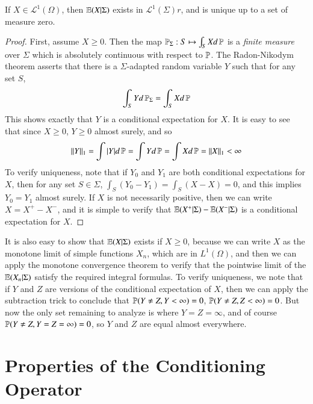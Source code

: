 
\begin{theorem}
    If $X \in \mathcal{L}^1(\Omega)$, then $\operatorname{\mathbb{E}}(X|\Sigma)$ exists in $\mathcal{L}^1(\Sigma)r$, and is unique up to a set of measure zero.
\end{theorem}
\begin{proof}
    First, assume $X \geq 0$. Then the map $\operatorname{\mathbb{P}}_\Sigma: S \mapsto \int_S X d \operatorname{\mathbb{P}}$ is a {\it finite measure} over $\Sigma$ which is absolutely continuous with respect to $\operatorname{\mathbb{P}}$. The Radon-Nikodym theorem asserts that there is a $\Sigma$-adapted random variable $Y$ such that for any set $S$,
    \[ \int_S Y d\operatorname{\mathbb{P}}_\Sigma = \int_S X d\operatorname{\mathbb{P}} \]
    This shows exactly that $Y$ is a conditional expectation for $X$. It is easy to see that since $X \geq 0$, $Y \geq 0$ almost surely, and so
    \[ \| Y \|_1 = \int |Y| d\operatorname{\mathbb{P}} = \int Yd\operatorname{\mathbb{P}} = \int Xd\operatorname{\mathbb{P}} = \| X \|_1 < \infty \]
    To verify uniqueness, note that if $Y_0$ and $Y_1$ are both conditional expectations for $X$, then for any set $S \in \Sigma$, $\int_S (Y_0 - Y_1) = \int_S (X - X) = 0$, and this implies $Y_0 = Y_1$ almost surely. If $X$ is not necessarily positive, then we can write $X = X^+ - X^-$, and it is simple to verify that $\operatorname{\mathbb{E}}(X^+|\Sigma) - \operatorname{\mathbb{E}}(X^-|\Sigma)$ is a conditional expectation for $X$.
\end{proof}

It is also easy to show that $\operatorname{\mathbb{E}}(X|\Sigma)$ exists if $X \geq 0$, because we can write $X$ as the monotone limit of simple functions $X_n$, which are in $L^1(\Omega)$, and then we can apply the monotone convergence theorem to verify that the pointwise limit of the $\operatorname{\mathbb{E}}(X_n|\Sigma)$ satisfy the required integral formulas. To verify uniqueness, we note that if $Y$ and $Z$ are versions of the conditional expectation of $X$, then we can apply the subtraction trick to conclude that $\operatorname{\mathbb{P}}(Y \neq Z, Y < \infty) = 0$, $\operatorname{\mathbb{P}}(Y \neq Z, Z < \infty) = 0$. But now the only set remaining to analyze is where $Y = Z = \infty$, and of course $\operatorname{\mathbb{P}}(Y \neq Z, Y = Z = \infty) = 0$, so $Y$ and $Z$ are equal almost everywhere.

\section{Properties of the Conditioning Operator}

